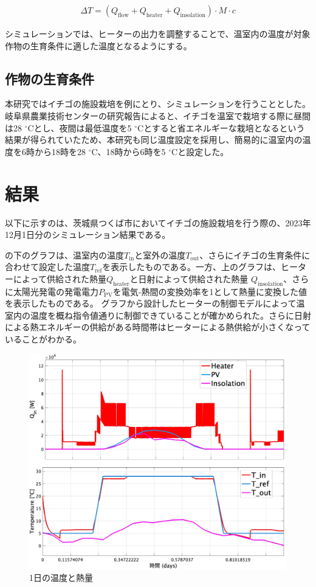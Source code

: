 \documentclass[uplatex,dvipdfmx,nomag,a4paper,oneside,onecolumn,12pt]{bxjsreport} %
\begin{document}
\begin{align}
    \Delta T = (Q_\text{flow} + Q_\text{heater} + Q_\text{insolation}) \cdot M \cdot c
    \label{DeltaT}
\end{align}

シミュレーションでは、ヒーターの出力を調整することで、温室内の温度が対象作物の生育条件に適した温度となるようにする。


\section{作物の生育条件}
本研究ではイチゴの施設栽培を例にとり、シミュレーションを行うこととした。岐阜県農業技術センターの研究報告\cite{strawberry2010}によると、イチゴを温室で栽培する際に昼間は28 \(^\circ\)Cとし、夜間は最低温度を5 \(^\circ\)Cとすると省エネルギーな栽培となるという結果が得られていたため、本研究も同じ温度設定を採用し、簡易的に温室内の温度を6時から18時を28 \(^\circ\)C、18時から6時を5 \(^\circ\)Cと設定した。

\chapter{結果}
以下に示すのは、茨城県つくば市においてイチゴの施設栽培を行う際の、2023年12月1日分のシミュレーション結果である。


の下のグラフは、温室内の温度\(T_\text{in}\)と室外の温度\(T_\text{out}\)、さらにイチゴの生育条件に合わせて設定した温度\(T_\text{ref}\)を表示したものである。一方、上のグラフは、ヒーターによって供給された熱量\(Q_\text{heater}\)と日射によって供給された熱量 \(Q_\text{insolation}\)、さらに太陽光発電の発電電力\(P_\text{PV}\)を電気-熱間の変換効率を1として熱量に変換した値を表示したものである。
グラフから設計したヒーターの制御モデルによって温室内の温度を概ね指令値通りに制御できていることが確かめられた。さらに日射による熱エネルギーの供給がある時間帯はヒーターによる熱供給が小さくなっていることがわかる。


\begin{figure}[ht]
    \centering
    \includegraphics[width=0.7\linewidth]{fig/Qin-Temp.jpg}
    \caption{1日の温度と熱量}
    \label{fig:QinTemp}
\end{figure}
\end{document}
